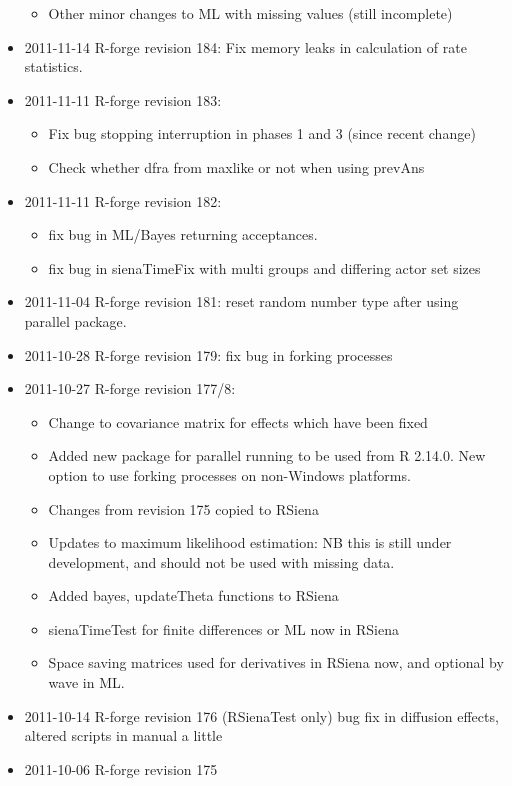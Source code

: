 \documentclass[a4paper,fleqn,11pt]{article}
\newcommand{\+}{\, + \,}
\begin{document}
\begin{small}
\begin{itemize}
\begin{itemize}
\item Other minor changes to ML with missing values (still incomplete)
\end{itemize}
\item 2011-11-14 R-forge revision 184:
Fix memory leaks in calculation of rate statistics.
\item 2011-11-11 R-forge revision 183:
\begin{itemize}
\item Fix bug stopping interruption in phases 1 and 3 (since recent change)
\item Check whether dfra from maxlike or not when using prevAns
\end{itemize}
\item 2011-11-11 R-forge revision 182:
\begin{itemize}
\item fix bug in ML/Bayes returning
  acceptances.
\item fix bug in sienaTimeFix with multi groups and differing actor set sizes
\end{itemize}
\item 2011-11-04 R-forge revision 181: reset random number type after using
  parallel package.
\item 2011-10-28 R-forge revision 179: fix bug in forking processes
\item 2011-10-27 R-forge revision 177/8:
\begin{itemize}
\item Change to covariance matrix for effects which have been fixed
\item Added new package for parallel running to be used from R 2.14.0. New
  option to use forking processes on non-Windows platforms.
\item Changes from revision 175 copied to RSiena
\item Updates to maximum likelihood estimation: NB this is still under
  development, and should not be used with missing data.
\item Added bayes, updateTheta functions to RSiena
\item sienaTimeTest for finite differences or ML now in RSiena
\item Space saving matrices used for derivatives in RSiena now, and optional by
  wave in ML.
\end{itemize}
\item 2011-10-14 R-forge revision 176 (RSienaTest only)
bug fix in diffusion effects, altered scripts in manual a little
\item 2011-10-06 R-forge revision 175

\end{itemize}
\end{small}
\end{document}
